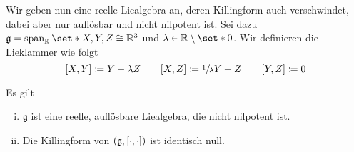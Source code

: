 Wir geben nun eine reelle Liealgebra an, deren Killingform auch verschwindet, dabei aber nur auflösbar und nicht nilpotent ist.
Sei dazu $\mathfrak{g} = \Span_{\mathbb{R}} \set*{X,Y,Z} \cong \mathbb{R}^3$ und $\lambda \in \mathbb{R}\setminus \set*{0}$.
Wir definieren die Lieklammer wie folgt
\[
	\benbrace*{X,Y} \coloneqq Y- \lambda Z  \qquad \benbrace*{X,Z} \coloneqq \sfrac{1}{\lambda}Y + Z \qquad \benbrace*{Y,Z} \coloneqq 0
\]
\begin{lemma}
	Es gilt
	\begin{enumerate}[(i)]
		\item $\mathfrak{g}$ ist eine reelle, auflösbare Liealgebra, die nicht nilpotent ist.
		\item Die Killingform von $(\mathfrak{g}, \benbrace*{\cdot,\cdot })$ ist identisch null.
	\end{enumerate}
\end{lemma}
